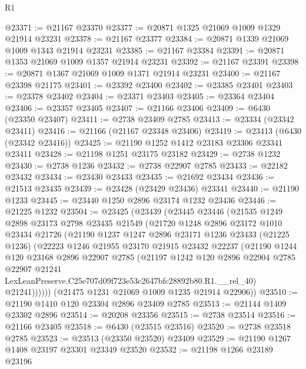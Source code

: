 \begin{lexlean}{R1}
\begin{coremodule}
@23371 := @21167 @23370
@23377 := @20871 @1325 @21069 @1009 @1329 @21914 @23231
@23378 := @21167 @23377
@23384 := @20871 @1339 @21069 @1009 @1343 @21914 @23231
@23385 := @21167 @23384
@23391 := @20871 @1353 @21069 @1009 @1357 @21914 @23231
@23392 := @21167 @23391
@23398 := @20871 @1367 @21069 @1009 @1371 @21914 @23231
@23400 := @21167 @23398 @21175
@23401 := @23392 @23400
@23402 := @23385 @23401
@23403 := @23378 @23402
@23404 := @23371 @23403
@23405 := @23364 @23404
@23406 := @23357 @23405
@23407 := @21166 @23406
@23409 := @6430 (@23350 @23407)
@23411 := @2738 @23409 @2785
@23413 := @23334 (@23342 @23411)
@23416 := @21166 (@21167 @23348 @23406)
@23419 := @23413 (@6430 (@23342 @23416))
@23425 := @21190 @1252 @1412 @23183 @23306 @23341 @23411
@23428 := @21198 @1251 @23175 @23182
@23429 := @2738 @1232
@23430 := @2738 @1236
@23432 := @2738 @22907 @2785
@23433 := @22182 @23432
@23434 := @23430 @23433
@23435 := @21692 @23434
@23436 := @21513 @23435
@23439 := @23428 (@23429 @23436) @23341
@23440 := @21190 @1233
@23445 := @23440 @1250 @2896 @23174 @1232 @23436
@23446 := @21225 @1232
@23504 := @23425
    (@23439
      (@23445
        @23446
        (@21535
          @1249
          @2898
          @23173
          @2798
          @23435
          @21549
          (@21720
            @1248
            @2896
            @23172
            @1010
            @23434
            @21726
            (@21190
              @1237
              @1247
              @2896
              @23171
              @1236
              @23433
              (@21225 @1236)
              (@22223
                @1246
                @21955
                @23170
                @21915
                @23432
                @22237
                (@21190
                  @1244
                  @120
                  @23168
                  @2896
                  @22907
                  @2785
                  (@21197
                    @1242
                    @120
                    @2896
                    @22904
                    @2785
                    @22907
                    @21241
                    LexLeanPreserve.C25e707d09f723e53c2647bfc28892b80.R1.__rel_40)
                  @21241))))))
      (@21475 @1231 @21069 @1009 @1235 @21914 @22906))
@23510 := @21190 @1410 @120 @23304 @2896 @23409 @2785
@23513 := @21144 @1409 @23302 @2896
@23514 := @20208 @23356
@23515 := @2738 @23514
@23516 := @21166 @23405
@23518 := @6430 (@23515 @23516)
@23520 := @2738 @23518 @2785
@23523 := @23513 (@23350 @23520) @23409
@23529 := @21190 @1267 @1408 @23197 @23301 @23349 @23520
@23532 := @21198 @1266 @23189 @23196

\end{coremodule}
\end{lexlean}
